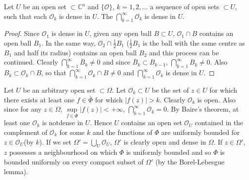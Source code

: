 \medskip
{}
Let $U$ be an open set $\subset \mathbb{C}^n$ and $\{\mathscr{O}\}$, $k =
1,2,\ldots$ a sequence of open sets $\subset U$, such that each
$\mathscr{O}_k$ is dense in $U$. The $\bigcap\limits^\infty_{k=1}
\mathscr{O}_k$ is dense in $U$.

\begin{proof}
Since $\mathscr{O}_1$ is dense in $U$, given any open ball $B \subset
U$, $\mathscr{O}_1 \cap B$ contains an open ball $B_1$. In the same
way, $\mathscr{O}_2 \cap \frac{1}{2} B_1$ ($\frac{1}{2} B_1$ is the
ball with the same centre as $B_1$ and half its radius) contains an
open ball $B_2$ and this process can be continued. Clearly
$\bigcap\limits^\infty_{k=1} \bar{B}_k \neq 0$ and since $\bar{B}_k \subset
B_{k-1}$, $\bigcap\limits^\infty_{k=1} B_k \neq 0$. Also $B_k \subset
\mathscr{O}_k \cap B$, so that $\bigcap\limits^\infty_{k=1}
\mathscr{O}_k \cap B \neq 0$ and $\bigcap\limits^\infty_{k=1}
\mathscr{O}_k$ is dense in $U$. 
\end{proof}

\medskip
{}

Let $U$ be an arbitrary open set $\subset \Omega$. Let $\mathscr{O}_k
\subset U$ be the set of $z\in U$ for which there exists at least one
$f\in\bar{\Phi}$ for which $|f(z)|>k$. Clearly $\mathscr{O}_k$ is
open. Also since for any $z \in \Omega$,
$\sup\limits_{f\in\Phi}|f(z)|< + \infty$,
$\bigcap\limits^\infty_{k=1}\mathscr{O}_k =0$. By Baire's theorem, at
least one $\mathscr{O}_k$ is not\pageoriginale dense in $U$. Hence $U$
contains an open set $\mathscr{O}_U$ contained in the complement of
$\mathscr{O}_k$ for some $k$ and the functions of $\Phi$ are uniformly
bounded for $z \in \mathscr{O}_U$(by $k$). If we set $\Omega' =
\bigcup\limits_U \mathscr{O}_U$, $\Omega'$ is clearly open and dense
in $\Omega$. If $z \in \Omega'$, $z$ possesses a neighbourhood on
which $\Phi$ is uniformly bounded and so $\Phi$ is bounded uniformly
on every compact subset of $\Omega'$ (by the Borel-Lebesgue lemma).
